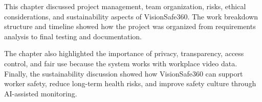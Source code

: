 This chapter discussed project management, team organization, risks, ethical considerations, and sustainability aspects of VisionSafe360. The work breakdown structure and timeline showed how the project was organized from requirements analysis to final testing and documentation.

The chapter also highlighted the importance of privacy, transparency, access control, and fair use because the system works with workplace video data. Finally, the sustainability discussion showed how VisionSafe360 can support worker safety, reduce long-term health risks, and improve safety culture through AI-assisted monitoring.
